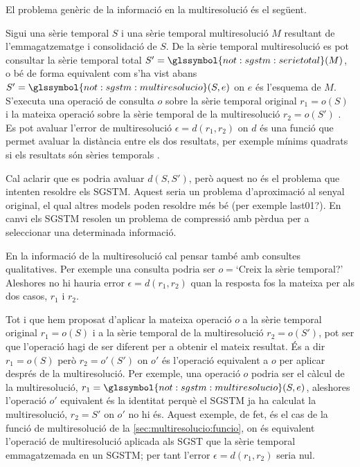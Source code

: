 El problema genèric de la informació en la multiresolució és el següent.
\begin{definition}
  Sigui una sèrie temporal $S$ i una sèrie temporal multiresolució $M$
  resultant de l'emmagatzematge i consolidació de $S$. De la sèrie
  temporal multiresolució es pot consultar la sèrie temporal total
  $S'=\glssymbol{not:sgstm:serietotal}(M)$, o bé de forma equivalent
  com s'ha vist abans
  $S'=\glssymbol{not:sgstm:multiresolucio}(S,e)$ on $e$ és l'esquema
  de $M$.  S'executa una operació de consulta $o$ sobre la sèrie
  temporal original $r_1=o(S)$ i la mateixa operació sobre la sèrie
  temporal de la multiresolució $r_2=o(S')$ . Es pot avaluar l'error
  de multiresolució $\epsilon=d(r_1,r_2)$ on $d$ és una funció que
  permet avaluar la distància entre els dos resultats, per exemple
  mínims quadrats si els resultats són sèries temporals .
\end{definition}


Cal aclarir que es podria avaluar $d(S,S')$, però aquest no és el
problema que intenten resoldre els \gls{SGSTM}. Aquest seria un
problema d'aproximació al senyal original, el qual altres models poden
resoldre més bé (per exemple last01?). En canvi els \gls{SGSTM} resolen un
problema de compressió amb pèrdua per a seleccionar una determinada
informació.




En la informació de la multiresolució cal pensar també amb consultes
qualitatives. Per exemple una consulta podria ser $o=$`Creix la sèrie
temporal?' Aleshores no hi hauria error $\epsilon=d(r_1,r_2)$ quan la
resposta fos la mateixa per als dos casos, $r_1$ i $r_2$.


Tot i que hem proposat d'aplicar la mateixa operació $o$ a la
sèrie temporal original $r_1=o(S)$ i a la sèrie temporal de la
multiresolució $r_2=o(S')$, pot ser que l'operació hagi de ser
diferent per a obtenir el mateix resultat. És a dir $r_1=o(S)$ però
$r_2=o'(S')$ on $o'$ és l'operació equivalent a $o$ per aplicar
després de la multiresolució.  Per exemple, una operació $o$ podria
ser el càlcul de la multiresolució,
$r_1=\glssymbol{not:sgstm:multiresolucio}(S,e)$, aleshores l'operació
$o'$ equivalent és la identitat perquè el \gls{SGSTM} ja ha calculat
la multiresolució, $r_2=S'$ on $o'$ no hi és. Aquest exemple, de fet,
és el cas de la funció de multiresolució de la
\autoref{sec:multiresolucio:funcio}, on és equivalent l'operació de
multiresolució aplicada als \gls{SGST} que la sèrie temporal
emmagatzemada en un \gls{SGSTM}; per tant l'error
$\epsilon =d(r_1,r_2)$ seria nul.



